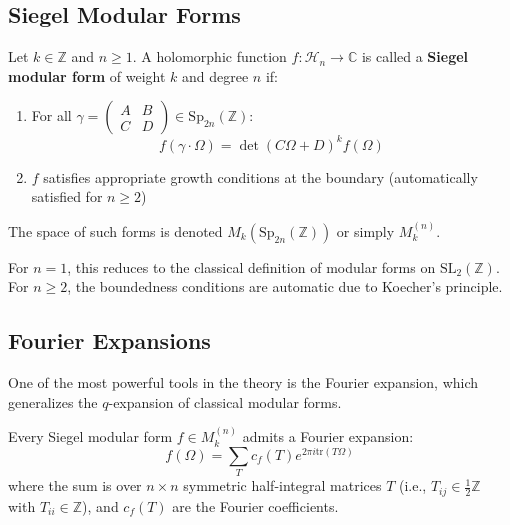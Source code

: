 \subsection{Siegel Modular Forms}

\begin{definition}
\label{def:siegel_modular_forms}
Let $k \in \mathbb{Z}$ and $n \geq 1$. A holomorphic function $f: \mathcal{H}_n \to \mathbb{C}$ is called a \textbf{Siegel modular form} of weight $k$ and degree $n$ if:
\begin{enumerate}
\item For all $\gamma = \begin{pmatrix} A & B \\ C & D \end{pmatrix} \in \mathrm{Sp}_{2n}(\mathbb{Z})$:
\begin{equation}
f(\gamma \cdot \Omega) = \det(C\Omega + D)^k f(\Omega)
\label{eq:transformation_law}
\end{equation}
\item $f$ satisfies appropriate growth conditions at the boundary (automatically satisfied for $n \geq 2$)
\end{enumerate}

The space of such forms is denoted $M_k(\mathrm{Sp}_{2n}(\mathbb{Z}))$ or simply $M_k^{(n)}$.
\end{definition}

\begin{remark}
For $n = 1$, this reduces to the classical definition of modular forms on $\mathrm{SL}_2(\mathbb{Z})$. For $n \geq 2$, the boundedness conditions are automatic due to Koecher's principle.
\end{remark}

\subsection{Fourier Expansions}

One of the most powerful tools in the theory is the Fourier expansion, which generalizes the $q$-expansion of classical modular forms.

\begin{theorem}
\label{thm:fourier_expansion}
Every Siegel modular form $f \in M_k^{(n)}$ admits a Fourier expansion:
\begin{equation}
f(\Omega) = \sum_{T} c_f(T) e^{2\pi i \mathrm{tr}(T\Omega)}
\label{eq:fourier_expansion}
\end{equation}
where the sum is over $n \times n$ symmetric half-integral matrices $T$ (i.e., $T_{ij} \in \frac{1}{2}\mathbb{Z}$ with $T_{ii} \in \mathbb{Z}$), and $c_f(T)$ are the Fourier coefficients.
\end{theorem}

